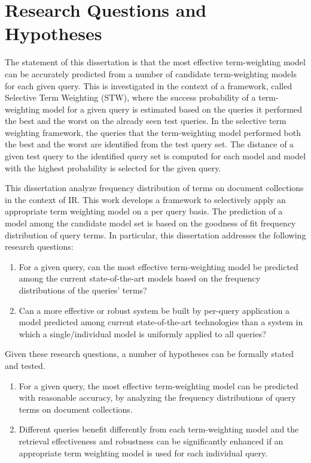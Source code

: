 \section{Research Questions and Hypotheses}
\label{1.3}

The statement of this dissertation is that the most effective term-weighting model can be accurately predicted from a number of candidate term-weighting models for each given query.
This is investigated in the context of a framework, called Selective Term Weighting (STW), where the success probability of a term-weighting model for a given query is estimated based on the queries it performed the best and the worst on the already seen test queries.
In the selective term weighting framework, the queries that the term-weighting model performed both the best and the worst are identified from the test query set.
The distance of a given test query to the identified query set is computed for each model and model with the highest probability is selected for the given query.

This dissertation analyze frequency distribution of terms on document collections in the context of IR.
This work develops a framework to selectively apply an appropriate term weighting model on a per query basis.
The prediction of a model among the candidate model set is based on the goodness of fit frequency distribution of query terms.
In particular, this dissertation addresses the following research questions:

\begin{enumerate}[label=\ac R\arabic*\kapa]
  \item For a given query, can the most effective term-weighting model be predicted among the current state-of-the-art models based on the frequency distributions of the queries' terms?
  \item Can a more effective or robust system be built by per-query application a model predicted among current state-of-the-art technologies than a system in which a single/individual model is uniformly applied to all queries? 
\end{enumerate}

\noindent Given these research questions, a number of hypotheses can be formally stated and tested.

\begin{enumerate}[label=\ac H\arabic*\kapa]
  \item For a given query, the most effective term-weighting model can be predicted with reasonable accuracy, by analyzing the frequency distributions of query terms on document collections.
  \item Different queries benefit differently from each term-weighting model and the retrieval effectiveness and robustness can be significantly enhanced if an appropriate term weighting model is used for each individual query. 
\end{enumerate}

